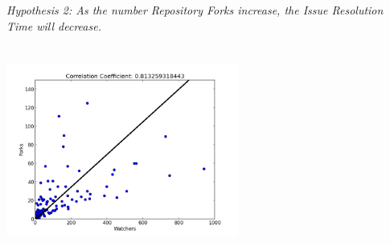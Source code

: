 \documentclass{proc}
\begin{document}
\emph{Hypothesis 2: As the number Repository Forks increase, the Issue Resolution Time will decrease.}\\
\includegraphics[height=3in,width=3in]{images/watcher_forks_scatterplot.png}
\end{document}
